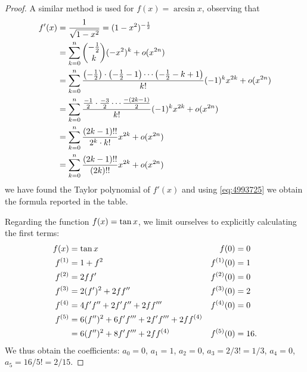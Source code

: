 \begin{proof}
A similar method is used for $f(x)=\arcsin x$, observing that
\begin{align*}
  f'(x) &= \frac{1}{\sqrt{1-x^2}}
  = (1-x^2)^{-\frac 1 2} \\
  &= \sum_{k=0}^n {-\frac 1 2 \choose k} (-x^2)^k + o(x^{2n}) \\
    &= \sum_{k=0}^n \frac{{\left( -\frac 1 2 \right)}\cdot {\left( -\frac 1 2 -
  1 \right)}\cdots {\left( -\frac 1 2 - k+1 \right)}}{k!}(-1)^k x^{2k} + o(x^{2n}) \\
    &= \sum_{k=0}^n \frac{\frac{-1}{2} \cdot \frac{-3}{2}\cdots
  \frac{-(2k-1)}{2}}{k!}(-1)^k x^{2k} + o(x^{2n}) \\
  &= \sum_{k=0}^n \frac{(2k-1)!!}{2^k \cdot k!}x^{2k} + o(x^{2n}) \\
  &= \sum_{k=0}^n \frac{(2k-1)!!}{(2k)!!}x^{2k} + o(x^{2n})
 \end{align*}
we have found the Taylor polynomial of $f'(x)$ and using \eqref{eq:4993725}
we obtain the formula reported in the table.

Regarding the function $f(x) = \operatorname{tan} x$, we limit ourselves to explicitly
calculating the first terms:
\begin{align*}
  f(x) &= \operatorname{tan} x
  & f(0)&=0\\
  f^{(1)} &= 1+ f^2
  & f^{(1)}(0) &= 1\\
  f^{(2)} &= 2ff'
  & f^{(2)}(0) &= 0 \\
  f^{(3)} &= 2(f')^2 + 2f f''
  & f^{(3)}(0) &= 2 \\
  f^{(4)} &= 4 f' f'' + 2 f' f'' + 2 f f'''
   & f^{(4)}(0) &= 0 \\
   f^{(5)} &= 6 (f'')^2 + 6 f' f''' + 2 f' f''' + 2 f f^{(4)}&&\\
           &= 6 (f'')^2 + 8 f' f''' + 2 f f^{(4)}
    & f^{(5)}(0) &= 16.
\end{align*}
We thus obtain the coefficients:
  $a_0 = 0$, $a_1 = 1$, $a_2 = 0$, $a_3 = 2/3! = 1/3$, $a_4=0$, $a_5 = 16/ 5! =
 2/15$.
\end{proof}